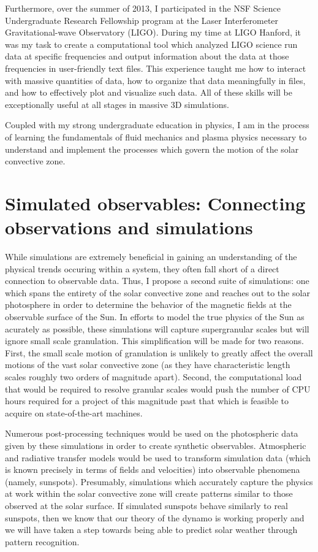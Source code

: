 \documentclass[aasms,12pt]{article}
\begin{document}
Furthermore, over the summer of 2013, I participated in the NSF Science
Undergraduate Research Fellowship program at the Laser Interferometer
Gravitational-wave Observatory (LIGO).  During my time at LIGO Hanford, it was
my task to create a computational tool which analyzed LIGO science run data at
specific frequencies and output information about the data at those frequencies
in user-friendly text files.  This experience taught me how to interact with
massive quantities of data, how to organize that data meaningfully in files,
and how to effectively plot and visualize such data.  All of these skills
will be exceptionally useful at all stages in massive 3D simulations.

Coupled with my strong undergraduate education in physics, I am in the process
of learning the fundamentals of fluid mechanics and plasma physics necessary to
understand and implement the processes which govern the motion of the solar 
convective zone.

\section{Simulated observables: Connecting observations and simulations}
While simulations are extremely beneficial in gaining an understanding of the
physical trends occuring within a system, they often fall short of a direct
connection to observable data.  Thus, I propose a second suite of simulations:
one which spans the entirety of the solar convective zone and reaches out to
the solar photosphere in order to determine the behavior of the magnetic fields
at the observable surface of the Sun.  In efforts to model the true physics of
the Sun as acurately as possible, these simulations will capture supergranular 
scales but will ignore small scale granulation.  This simplification will be
made for two reasons.  First, the small scale motion of granulation is unlikely
to greatly affect the overall motions of the vast solar convective zone (as
they have characteristic length scales roughly two orders of magnitude apart).
Second, the computational load that would be required to resolve granular scales
would push the number of CPU hours required for a project of this magnitude
past that which is feasible to acquire on state-of-the-art machines.

Numerous post-processing techniques would be used on the photospheric data 
given by these simulations in order to create synthetic observables.
Atmospheric and radiative transfer models would be used to transform simulation
data (which is known precisely in terms of fields and velocities) into
observable phenomena (namely, sunspots). 
Presumably, simulations
which accurately capture the physics at work within the solar convective zone
will create patterns similar to those observed at the solar surface.  If
simulated sunspots behave similarly to real sunspots, then we know that our
theory of the dynamo is working properly and we will have taken a step towards
being able to predict solar weather through pattern recognition.
\end{document}
